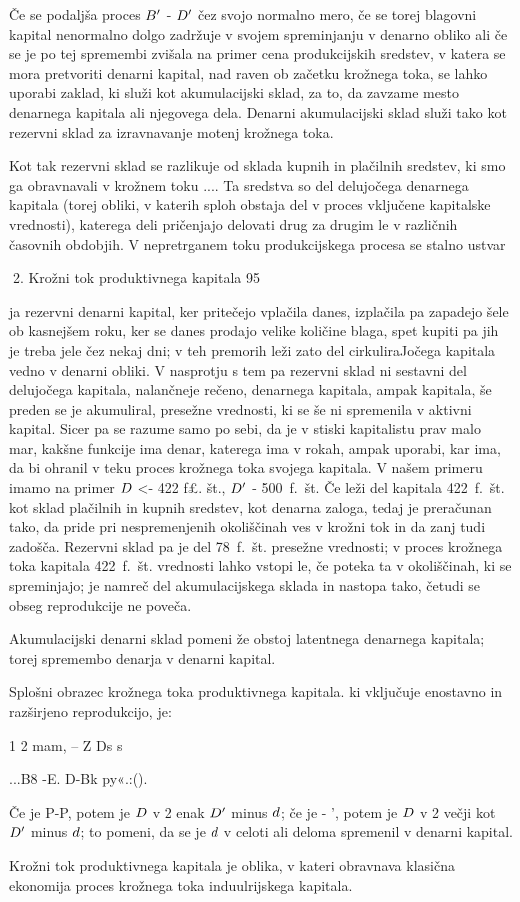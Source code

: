 \documentclass[kapital_02.tex]{subfiles}
\begin{document}
Če se podaljša proces \( B' \) - \( D' \) čez svojo normalno mero, če se torej blagovni kapital nenormalno dolgo zadržuje v svojem spreminjanju v denarno obliko ali če se je po tej spremembi zvišala na primer cena produkcijskih sredstev, v katera se mora pretvoriti denarni kapital, nad raven ob začetku krožnega toka, se lahko uporabi zaklad, ki služi kot akumulacijski sklad, za to, da zavzame mesto denarnega kapitala ali njegovega dela. Denarni akumulacijski sklad služi tako kot rezervni sklad za izravnavanje motenj krožnega toka.

Kot tak rezervni sklad se razlikuje od sklada kupnih in plačilnih sredstev, ki smo ga obravnavali v krožnem toku \KPEP...\KPEP. Ta sredstva so del delujočega denarnega kapitala (torej obliki, v katerih sploh obstaja del v proces vključene kapitalske vrednosti), katerega deli pričenjajo delovati drug za drugim le v različnih časovnih obdobjih. V nepretrganem toku produkcijskega procesa se stalno ustvar

 2. Krožni tok produktivnega kapitala 95



 ja rezervni denarni kapital, ker pritečejo vplačila danes, izplačila pa zapadejo šele ob kasnejšem roku, ker se danes prodajo velike količine blaga, spet kupiti pa jih je treba jele čez nekaj dni; v teh premorih leži zato del cirkuliraJočega kapitala vedno v denarni obliki. V nasprotju s tem pa rezervni sklad ni sestavni del delujočega kapitala, nalančneje rečeno, denarnega kapitala, ampak kapitala, še preden se je akumuliral, presežne vrednosti, ki se še ni spremenila v aktivni kapital. Sicer pa se razume samo po sebi, da je v stiski kapitalistu prav malo mar, kakšne funkcije ima denar, katerega ima v rokah, ampak uporabi, kar ima, da bi ohranil v teku proces krožnega toka svojega kapitala. V našem primeru imamo na primer \( D \) <- 422 f£. št., \( D' \) - 500~f.~št. Če leži del kapitala 422~f.~št. kot sklad plačilnih in kupnih sredstev, kot denarna zaloga, tedaj je preračunan tako, da pride pri nespremenjenih okoliščinah ves v krožni tok in da zanj tudi zadošča. Rezervni sklad pa je del 78~f.~št. presežne vrednosti; v proces krožnega toka kapitala 422~f.~št. vrednosti lahko vstopi le, če poteka ta v okoliščinah, ki se spreminjajo; je namreč del akumulacijskega sklada in nastopa tako, četudi se obseg reprodukcije ne poveča.

Akumulacijski denarni sklad pomeni že obstoj latentnega denarnega kapitala; torej spremembo denarja v denarni kapital.

Splošni obrazec krožnega toka produktivnega kapitala. ki vključuje enostavno in razširjeno reprodukcijo, je:

1 2 mam, -- Z Ds s

\KPEP...B8 -E. D-Bk py«.:\KPEP (\KPEP).

Če je P-P, potem je \( D \) v 2 enak \( D' \) minus \( d \); če je \KPEP - \KPEP', potem je \( D \) v 2 večji kot \( D' \) minus \( d \); to pomeni, da se je \( d \) v celoti ali deloma spremenil v denarni kapital.

Krožni tok produktivnega kapitala je oblika, v kateri obravnava klasična ekonomija proces krožnega toka induulrijskega kapitala.

 

\end{document}

